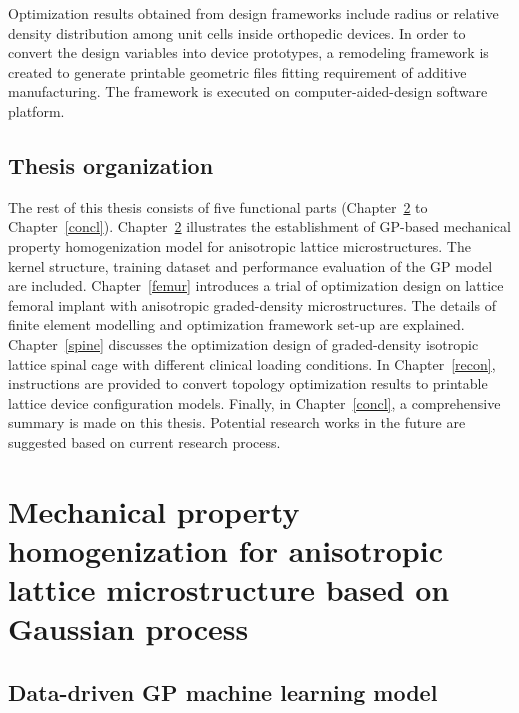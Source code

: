 \documentclass[12pt]{extbook}
\begin{document}
Optimization results obtained from design frameworks include radius or relative density distribution among unit cells inside orthopedic devices. In order to convert the design variables into device prototypes, a remodeling framework is created to generate printable geometric files fitting requirement of additive manufacturing. The framework is executed on computer-aided-design software platform.\\

\section{Thesis organization}
\label{intro_orga}

The rest of this thesis consists of five functional parts (Chapter~\ref{gauss} to Chapter~\ref{concl}). Chapter~\ref{gauss} illustrates the establishment of GP-based mechanical property homogenization model for anisotropic lattice microstructures. The kernel structure, training dataset and performance evaluation of the GP model are included. Chapter~\ref{femur} introduces a trial of optimization design on lattice femoral implant with anisotropic graded-density microstructures. The details of finite element modelling and optimization framework set-up are explained. Chapter~\ref{spine} discusses the optimization design of graded-density isotropic lattice spinal cage with different clinical loading conditions. In Chapter~\ref{recon}, instructions are provided to convert topology optimization results to printable lattice device configuration models. Finally, in Chapter~\ref{concl}, a comprehensive summary is made on this thesis. Potential research works in the future are suggested based on current research process.\\




\chapter{Mechanical property homogenization for anisotropic lattice microstructure based on Gaussian process}
\label{gauss}

\section{Data-driven GP machine learning model}
\label{gauss_gaus}
\end{document}
